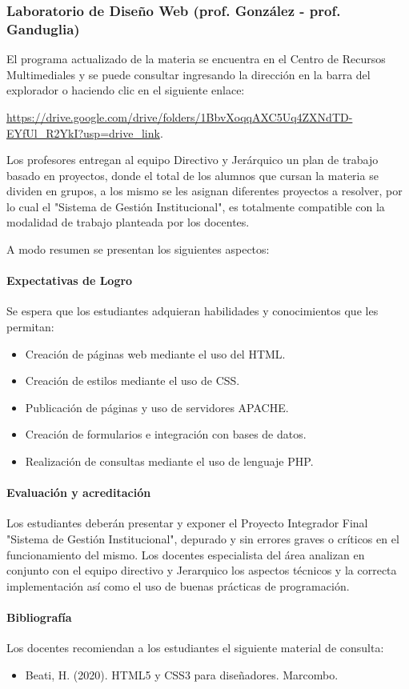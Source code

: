 \subsubsection{Laboratorio de Diseño Web (prof. González - prof. Ganduglia)}
El programa actualizado de la materia se encuentra en el Centro de Recursos Multimediales y se puede consultar ingresando la dirección en la barra del explorador o haciendo clic en el siguiente enlace:

\url{https://drive.google.com/drive/folders/1BbvXoqqAXC5Uq4ZXNdTD-EYfUl_R2YkI?usp=drive_link}.

Los profesores entregan al equipo Directivo y Jerárquico un plan de trabajo basado en proyectos, donde el total de los alumnos que cursan la materia se dividen en grupos, a los mismo se les asignan diferentes proyectos a resolver, por lo cual el "Sistema de Gestión Institucional", es totalmente compatible con la modalidad de trabajo planteada por los docentes.

A modo resumen se presentan los siguientes aspectos:
\paragraph{Expectativas de Logro}
Se espera que los estudiantes adquieran habilidades y conocimientos que les permitan: 

\begin{itemize}
    \item Creación de páginas web mediante el uso del HTML.
    \item Creación de estilos mediante el uso de CSS.
    \item Publicación de páginas y uso de servidores APACHE.
    \item Creación de formularios e integración con bases de datos.
    \item Realización de consultas mediante el uso de lenguaje PHP.

\end{itemize}

\paragraph{Evaluación y acreditación}

Los estudiantes deberán presentar y exponer el Proyecto Integrador Final "Sistema de Gestión Institucional", depurado y sin errores graves o críticos en el funcionamiento del mismo. Los docentes especialista del área analizan en conjunto con el equipo directivo y Jerarquico los aspectos técnicos y la correcta implementación así como el uso de buenas prácticas de programación.

\paragraph{Bibliografía} Los docentes recomiendan a los estudiantes el siguiente material de consulta:

\begin{itemize}
    \item Beati, H. (2020). HTML5 y CSS3 para diseñadores. Marcombo.
\end{itemize}
